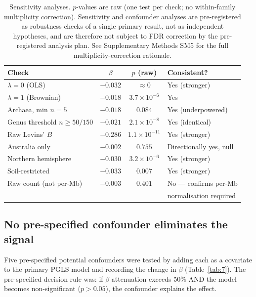 \documentclass[times]{zHenriquesLab-StyleBioRxiv}
\begin{document}
\begin{table}[htbp]
\caption{Sensitivity analyses. $p$-values are raw (one test per check; no
within-family multiplicity correction). Sensitivity and confounder analyses are
pre-registered as robustness checks of a single primary result, not as
independent hypotheses, and are therefore not subject to FDR correction by
the pre-registered analysis plan. See Supplementary Methods SM5 for the
full multiplicity-correction rationale.}
\label{tab:2}
\centering
\small
\begin{tabular}{lccl}
\toprule
Check & $\beta$ & $p$ (raw) & Consistent? \\
\midrule
$\lambda = 0$ (OLS) & $-0.032$ & $\approx 0$ & Yes (stronger) \\
$\lambda = 1$ (Brownian) & $-0.018$ & $3.7 \times 10^{-6}$ & Yes \\
Archaea, min $n = 5$ & $-0.018$ & $0.084$ & Yes (underpowered) \\
Genus threshold $n \geq 50/150$ & $-0.021$ & $2.1 \times 10^{-8}$ & Yes (identical) \\
Raw Levins' $B$ & $-0.286$ & $1.1 \times 10^{-11}$ & Yes (stronger) \\
Australia only & $-0.002$ & $0.755$ & Directionally yes, null \\
Northern hemisphere & $-0.030$ & $3.2 \times 10^{-6}$ & Yes (stronger) \\
Soil-restricted & $-0.033$ & $0.007$ & Yes (stronger) \\
Raw count (not per-Mb) & $-0.003$ & $0.401$ & No --- confirms per-Mb \\
 & & & normalisation required \\
\bottomrule
\end{tabular}
\end{table}



\subsection{No pre-specified confounder eliminates the signal}
\label{sec:confounders}

Five pre-specified potential confounders were tested by adding each as a
covariate to the primary PGLS model and recording the change in $\beta$
(Table~\ref{tab:7}). The pre-specified decision rule was: if $\beta$ attenuation
exceeds 50\% AND the model becomes non-significant ($p > 0.05$), the confounder
explains the effect.
\end{document}
